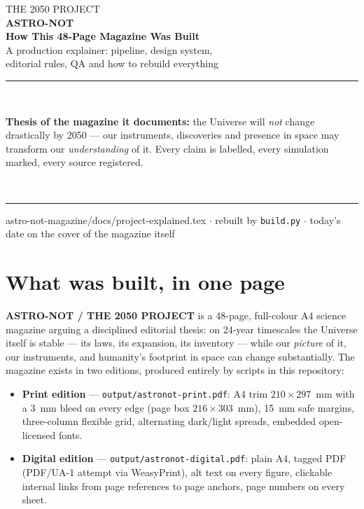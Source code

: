 \documentclass[11pt,a4paper]{article}
\newcommand{\code}[1]{\texttt{#1}}
\begin{document}
\begin{titlepage}
\centering
\vspace*{18mm}
{\color{deepblue}\Large THE 2050 PROJECT}\\[4mm]
{\color{navy}\Huge\bfseries ASTRO-NOT}\\[6mm]
{\color{navy}\LARGE\bfseries How This 48-Page Magazine Was Built}\\[8mm]
{\color{deepblue}\large A production explainer: pipeline, design system,\\ editorial rules, QA and how to rebuild everything}\\[14mm]
{\color{sun}\rule{80mm}{1.2pt}}\\[10mm]
\begin{minipage}{0.8\textwidth}\centering\color{deepblue}
\textbf{Thesis of the magazine it documents:} the Universe will \emph{not}
change drastically by 2050 --- our instruments, discoveries and presence in
space may transform our \emph{understanding} of it. Every claim is labelled,
every simulation marked, every source registered.
\end{minipage}\\[14mm]
{\color{sun}\rule{80mm}{1.2pt}}
\vfill
{\small\color{deepblue}astro-not-magazine/docs/project-explained.tex $\cdot$ rebuilt by \code{build.py} $\cdot$ today's date on the cover of the magazine itself}
\end{titlepage}

\tableofcontents
\newpage

\section{What was built, in one page}

\textbf{ASTRO-NOT / THE 2050 PROJECT} is a 48-page, full-colour A4 science
magazine arguing a disciplined editorial thesis: on 24-year timescales the
Universe itself is stable --- its laws, its expansion, its inventory --- while
our \emph{picture} of it, our instruments, and humanity's footprint in space
can change substantially. The magazine exists in two editions, produced
entirely by scripts in this repository:

\begin{itemize}[leftmargin=6mm,itemsep=1pt]
  \item \textbf{Print edition} --- \code{output/astronot-print.pdf}: A4 trim
        $210\times297$~mm with a 3~mm bleed on every edge (page box
        $216\times303$~mm), 15~mm safe margins, three-column flexible grid,
        alternating dark/light spreads, embedded open-licensed fonts.
  \item \textbf{Digital edition} --- \code{output/astronot-digital.pdf}: plain
        A4, tagged PDF (PDF/UA-1 attempt via WeasyPrint), alt text on every
        figure, clickable internal links from page references to page anchors,
        page numbers on every sheet.
\end{itemize}
\end{document}
